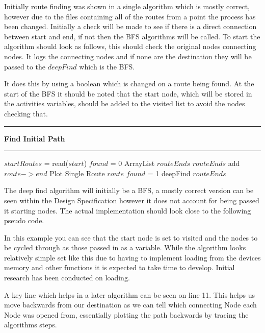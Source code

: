 Initially route finding was shown in a single algorithm which is mostly correct, however due to the files containing all of the routes from a point the process has been changed. Initially a check will be made to see if there is a direct connection between start and end, if not then the BFS algorithms will be called. To start the algorithm should look as follows, this should check the original nodes connecting nodes. It logs the connecting nodes and if none are the destination they will be passed to the $deepFind$ which is the BFS. 

It does this by using a boolean which is changed on a route being found. At the start of the BFS it should be noted that the start node, which will be stored in the activities variables, should be added to the visited list to avoid the nodes checking that. 
\vspace{0.3cm}
\hrule
\vspace{0.1cm}
\textbf{Find Initial Path}
\vspace{0.1cm}
\hrule
\vspace{0.1cm}
\begin{algorithmic}[1]
\State$startRoutes$ = read($start$)
\State $found$ = 0
\State ArrayList $routeEnds$
	\State $routeEnds$ add $route -> end$
		\State Plot Single Route $route$
		\State $found$ = 1
	\EndIf
\EndFor
{}
	\State deepFind $routeEnds$
\EndIf
\end{algorithmic}

The deep find algorithm will initially be a BFS, a mostly correct version can be seen within the Design Specification however it does not account for being passed it starting nodes. The actual implementation should look close to the following pseudo code. 

In this example you can see that the start node is set to visited and the nodes to be cycled through as those passed in as a variable. While the algorithm looks relatively simple set like this due to having to implement loading from the devices memory and other functions it is expected to take time to develop. Initial research has been conducted on loading. 

A key line which helps in a later algorithm can be seen on line 11. This helps us move backwards from our destination as we can tell which connecting Node each Node was opened from, essentially plotting the path backwards by tracing the algorithms steps. 

